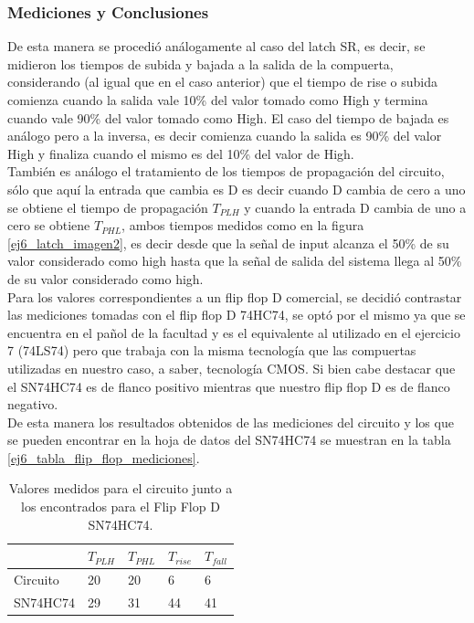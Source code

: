 \subsubsection{Mediciones y Conclusiones}
\noindent
De esta manera se procedió análogamente al caso del latch SR, es decir, se midieron los tiempos de subida y bajada a la salida de la compuerta, considerando (al igual que en el caso anterior) que el tiempo de rise o subida comienza cuando la salida vale 10\% del valor tomado como High y termina cuando vale 90\% del valor tomado como High. El caso del tiempo de bajada es análogo pero a la inversa, es decir comienza cuando la salida es 90\% del valor High y finaliza cuando el mismo es del 10\% del valor de High.\\
%
También es análogo el tratamiento de los tiempos de propagación del circuito, sólo que aquí la entrada que cambia es D es decir cuando D cambia de cero a uno se obtiene el tiempo de propagación $T_{PLH}$ y cuando la entrada D cambia de uno a cero se obtiene $T_{PHL}$, ambos tiempos medidos como en la figura \ref{ej6_latch_imagen2}, es decir desde que la señal de input alcanza el 50\% de su valor considerado como high hasta que la señal de salida del sistema llega al 50\% de su valor considerado como high.\\
%
Para los valores correspondientes a un flip flop D comercial, se decidió contrastar las mediciones tomadas con el flip flop D 74HC74, se optó por el mismo ya que se encuentra en el pañol de la facultad y es el equivalente al utilizado en el ejercicio 7 (74LS74) pero que trabaja con la misma tecnología que las compuertas utilizadas en nuestro caso, a saber, tecnología CMOS. Si bien cabe destacar que el SN74HC74 es de flanco positivo mientras que nuestro flip flop D es de flanco negativo.\\
De esta manera los resultados obtenidos de las mediciones del circuito y los que se pueden encontrar en la hoja de datos del SN74HC74 se muestran en la tabla \ref{ej6_tabla_flip_flop_mediciones}.
%
\begin{table}[H]
\caption{Valores medidos para el circuito junto a los encontrados para el Flip Flop D SN74HC74.}
\label{ej6_tabla_flip_flop_D}
\centering
\begin{tabular}{|l||l|l|l|l|}
\hline
    & $T_{PLH}$ & $T_{PHL}$ & $T_{rise}$ & $T_{fall}$ \\ \hline \hline
Circuito & 20        & 20        & 6          & 6          \\ \hline
SN74HC74 & 29        & 31        & 44         & 41         \\ \hline
\end{tabular}
\end{table}
